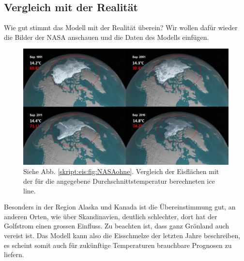 \begin{refsection}
\subsection{Vergleich mit der Realität}
Wie gut stimmt das Modell mit der Realität überein? Wir wollen dafür wieder die Bilder der NASA anschauen und die Daten des Modells einfügen.
\begin{figure}[H]
	\centering
	\includegraphics[width=14cm]{eis/NASA_mit_Breitengraden.jpg}
	\caption{Siehe Abb. \ref{skript:eis:fig:NASAohne}.
	Vergleich der Eisflächen mit der für die angegebene Durchschnittstemperatur berechneten ice line.}
\end{figure}
Besonders in der Region Alaska und Kanada ist die Übereinstimmung gut, an anderen Orten, wie über Skandinavien, deutlich schlechter, dort hat der Golfstrom einen grossen Einfluss. Zu beachten ist, dass ganz Grönland auch vereist ist. Das Modell kann also die Eisschmelze der letzten Jahre beschreiben, es scheint somit auch für zukünftige Temperaturen brauchbare Prognosen zu liefern.

\end{refsection}

